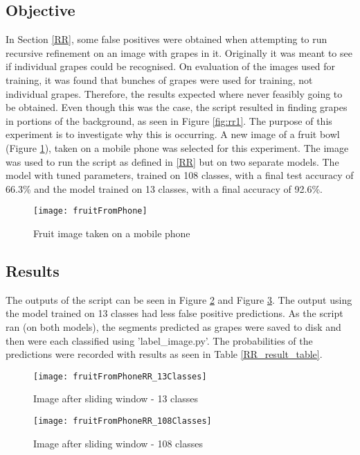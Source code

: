 \tocless\subsection{Objective}
In Section \ref{RR}, some false positives were obtained when attempting to run recursive refinement on an image with grapes in it.
Originally it was meant to see if individual grapes could be recognised.
On evaluation of the images used for training, it was found that bunches of grapes were used for training, not individual grapes.
Therefore, the results expected where never feasibly going to be obtained.
Even though this was the case, the script resulted in finding grapes in portions of the background, as seen in Figure \ref{fig:rr1}.
The purpose of this experiment is to investigate why this is occurring.
A new image of a fruit bowl (Figure \ref{fig:fruitFromPhone}), taken on a mobile phone was selected for this experiment.
The image was used to run the script as defined in \ref{RR} but on two separate models.
The model with tuned parameters, trained on 108 classes, with a final test accuracy of 66.3\% and the model trained on 13 classes, with a final accuracy of 92.6\%.

\begin{figure}[h]
\centering
    \texttt{[image: fruitFromPhone]}
      \caption{Fruit image taken on a mobile phone}
      \label{fig:fruitFromPhone}
\end{figure}

\tocless\subsection{Results}
The outputs of the script can be seen in Figure \ref{fig:fruitRR13} and Figure \ref{fig:fruitRR108}. The output using the model trained on 13 classes had less false positive predictions. As the script ran (on both models), the segments predicted as grapes were saved to disk and then were each classified using 'label\_image.py'. The probabilities of the predictions were recorded with results as seen in Table \ref{RR_result_table}.

\begin{figure}[h]
\centering
    \texttt{[image: fruitFromPhoneRR\_13Classes]}
      \caption{Image after sliding window - 13 classes}
      \label{fig:fruitRR13}
\end{figure}

\begin{figure}[h]
	\centering
    \texttt{[image: fruitFromPhoneRR\_108Classes]}
      \caption{Image after sliding window - 108 classes}
      \label{fig:fruitRR108}
\end{figure}


